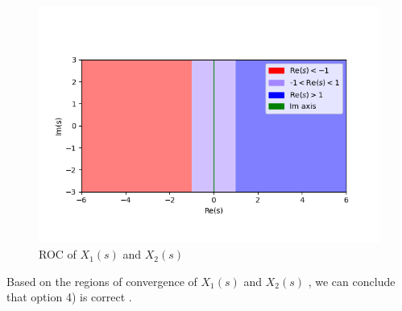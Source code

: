 \documentclass[journal,12pt,onecolumn]{IEEEtran}
\theoremstyle{remark}
\begin{document}
 \begin{figure}[!ht]    
    \centering
\graphicspath{ {figs/} }
\includegraphics[width=\columnwidth]{graph_1}
\caption{ ROC of $X_1(s)$ and $X_2(s)$  }
\label{graph:ee25-ag3}
\end{figure}

Based on the regions of convergence of  $X_1(s)$ and $X_2(s)$ , we can conclude that option 4) is correct .  
\end{document}

